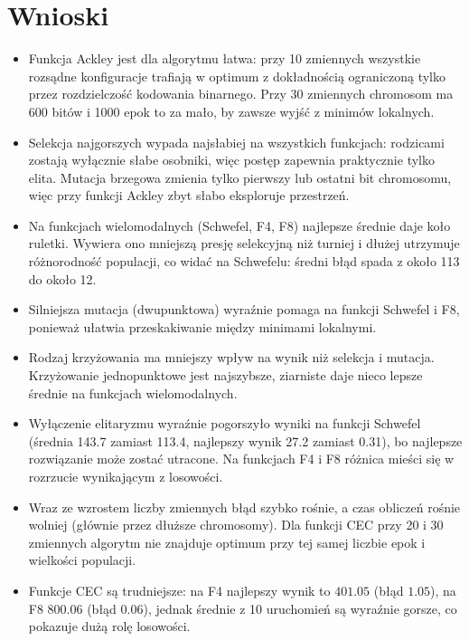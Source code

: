 \documentclass[11pt,a4paper]{article}
\begin{document}
\section{Wnioski}

\begin{itemize}
  \item Funkcja Ackley jest dla algorytmu łatwa: przy 10 zmiennych wszystkie rozsądne konfiguracje
        trafiają w optimum z dokładnością ograniczoną tylko przez rozdzielczość kodowania binarnego.
        Przy 30 zmiennych chromosom ma 600 bitów i 1000 epok to za mało, by zawsze wyjść z minimów lokalnych.
  \item Selekcja najgorszych wypada najsłabiej na wszystkich funkcjach: rodzicami zostają wyłącznie
        słabe osobniki, więc postęp zapewnia praktycznie tylko elita. Mutacja brzegowa zmienia tylko
        pierwszy lub ostatni bit chromosomu, więc przy funkcji Ackley zbyt słabo eksploruje przestrzeń.
  \item Na funkcjach wielomodalnych (Schwefel, F4, F8) najlepsze średnie daje koło ruletki. Wywiera
        ono mniejszą presję selekcyjną niż turniej i dłużej utrzymuje różnorodność populacji, co
        widać na Schwefelu: średni błąd spada z około 113 do około 12.
  \item Silniejsza mutacja (dwupunktowa) wyraźnie pomaga na funkcji Schwefel i F8, ponieważ
        ułatwia przeskakiwanie między minimami lokalnymi.
  \item Rodzaj krzyżowania ma mniejszy wpływ na wynik niż selekcja i mutacja. Krzyżowanie
        jednopunktowe jest najszybsze, ziarniste daje nieco lepsze średnie na funkcjach wielomodalnych.
  \item Wyłączenie elitaryzmu wyraźnie pogorszyło wyniki na funkcji Schwefel (średnia 143.7 zamiast 113.4,
        najlepszy wynik 27.2 zamiast 0.31), bo najlepsze rozwiązanie może zostać utracone. Na funkcjach
        F4 i F8 różnica mieści się w rozrzucie wynikającym z losowości.
  \item Wraz ze wzrostem liczby zmiennych błąd szybko rośnie, a czas obliczeń rośnie wolniej
        (głównie przez dłuższe chromosomy). Dla funkcji CEC przy 20 i 30 zmiennych algorytm
        nie znajduje optimum przy tej samej liczbie epok i wielkości populacji.
  \item Funkcje CEC są trudniejsze: na F4 najlepszy wynik to $401.05$ (błąd $1.05$), na F8 $800.06$
        (błąd $0.06$), jednak średnie z 10 uruchomień są wyraźnie gorsze, co pokazuje dużą rolę losowości.
\end{itemize}
\end{document}
